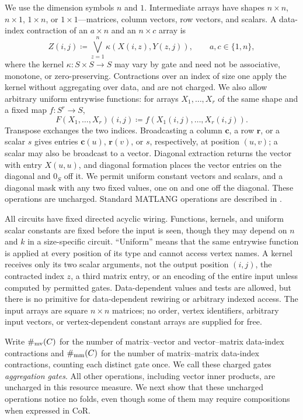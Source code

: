 We use the dimension symbols $n$ and $1$. Intermediate arrays have
shapes $n\times n$, $n\times1$, $1\times n$, or $1\times1$---matrices,
column vectors, row vectors, and scalars. A data-index contraction
of an $a\times n$ and an $n\times c$ array is
\[
 Z(i,j)\coloneqq\bigvee_{z=1}^n\kappa(X(i,z),Y(z,j)),
 \qquad a,c\in\{1,n\},
\]
where the kernel $\kappa:S\times S\to S$ may vary by gate and
need not be associative, monotone, or zero-preserving.
Contractions over an index of size one apply the kernel without
aggregating over data, and are not charged.
We also allow arbitrary uniform entrywise functions: for arrays
$X_1,\ldots,X_r$ of the same shape and a fixed map $f:S^r\to S$,
\[
 F(X_1,\ldots,X_r)(i,j)\coloneqq
 f(X_1(i,j),\ldots,X_r(i,j)).
\]
Transpose exchanges the two indices. Broadcasting a column $\mathbf c$,
a row $\mathbf r$, or a scalar $s$ gives entries $\mathbf c(u)$,
$\mathbf r(v)$, or $s$, respectively, at position $(u,v)$; a scalar
may also be broadcast to a vector. Diagonal extraction returns the
vector with entry $X(u,u)$, and diagonal formation places the vector
entries on the diagonal and $0_S$ off it. We permit uniform constant
vectors and scalars, and a diagonal mask with any two fixed values,
one on and one off the diagonal. These operations are uncharged.
Standard MATLANG operations are described in
\citep{brijder2019tods,brijder2022}.

All circuits have fixed directed acyclic wiring. Functions, kernels,
and uniform scalar constants are fixed before the input is seen,
though they may depend on $n$ and $k$ in a size-specific circuit.
``Uniform'' means that the same entrywise function is applied at
every position of its type and cannot access vertex names.
A kernel receives only its two scalar arguments, not the output
position $(i,j)$, the contracted index $z$, a third matrix entry,
or an encoding of the entire input unless computed by permitted
gates. Data-dependent values and tests are allowed, but there is
no primitive for data-dependent rewiring or arbitrary indexed
access. The input arrays are square $n\times n$ matrices; no order,
vertex identifiers, arbitrary input vectors, or vertex-dependent
constant arrays are supplied for free.

Write $\#_{\mathrm{mv}}(C)$ for the number of matrix--vector and
vector--matrix data-index contractions and $\#_{\mathrm{mm}}(C)$ for the
number of matrix--matrix data-index contractions, counting each
distinct gate once. We call these charged gates \emph{aggregation gates}.
All other operations, including vector inner products, are uncharged
in this resource measure. We next show that these
uncharged operations notice no folds, even though some of them may
require compositions when expressed in CoR.

